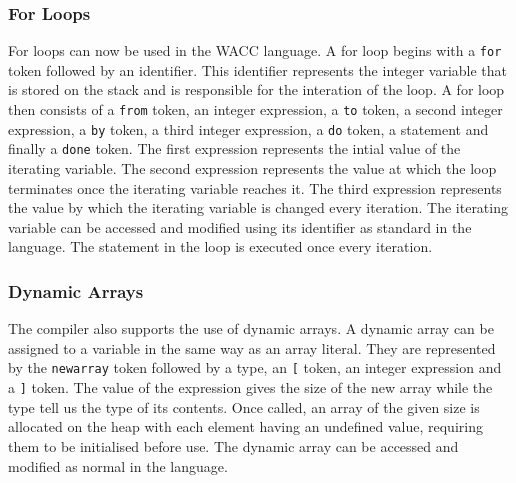 \documentclass[]{article}
\begin{document}
\subsubsection{For Loops} {For loops can now be used in the WACC language. A for loop begins with a {\tt for} token followed by an identifier. This identifier represents the integer variable that is stored on the stack and is responsible for the interation of the loop. A for loop then consists of a {\tt from} token, an integer expression, a {\tt to} token, a second integer expression, a {\tt by} token, a third integer expression, a {\tt do} token, a statement and finally a {\tt done} token. The first expression represents the intial value of the iterating variable. The second expression represents the value at which the loop terminates once the iterating variable reaches it. The third expression represents the value by which the iterating variable is changed every iteration. The iterating variable can be accessed and modified using its identifier as standard in the language. The statement in the loop is executed once every iteration.}
\subsubsection{Dynamic Arrays} { The compiler also supports the use of dynamic arrays. A dynamic array can be assigned to a variable in the same way as an array literal. They are represented by the {\tt newarray} token followed by a type, an {\tt [} token, an integer expression and a {\tt ]} token. The value of the expression gives the size of the new array while the type tell us the type of its contents. Once called, an array of the given size is allocated on the heap with each element having an undefined value, requiring them to be initialised before use. The dynamic array can be accessed and modified as normal in the language.}
\end{document}
